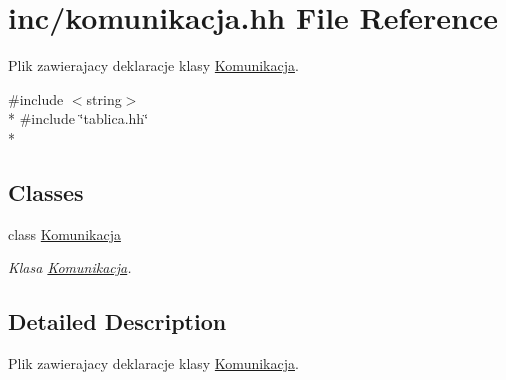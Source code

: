 \hypertarget{komunikacja_8hh}{\section{inc/komunikacja.hh File Reference}
\label{komunikacja_8hh}
}


Plik zawierajacy deklaracje klasy \hyperlink{class_komunikacja}{Komunikacja}.  


{\ttfamily \#include $<$string$>$}\\*
{\ttfamily \#include \char`\"{}tablica.\+hh\char`\"{}}\\*
\subsection*{Classes}
\begin{DoxyCompactItemize}
\item 
class \hyperlink{class_komunikacja}{Komunikacja}
\begin{DoxyCompactList}\small\item\em Klasa \hyperlink{class_komunikacja}{Komunikacja}. \end{DoxyCompactList}\end{DoxyCompactItemize}


\subsection{Detailed Description}
Plik zawierajacy deklaracje klasy \hyperlink{class_komunikacja}{Komunikacja}. 


